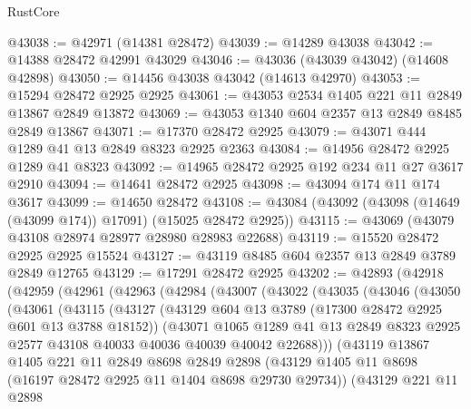 \begin{lexlean}{RustCore}
\begin{coremodule}
@43038 := @42971 (@14381 @28472)
@43039 := @14289 @43038
@43042 := @14388 @28472 @42991 @43029
@43046 := @43036 (@43039 @43042) (@14608 @42898)
@43050 := @14456 @43038 @43042 (@14613 @42970)
@43053 := @15294 @28472 @2925 @2925
@43061 := @43053 @2534 @1405 @221 @11 @2849 @13867 @2849 @13872
@43069 := @43053 @1340 @604 @2357 @13 @2849 @8485 @2849 @13867
@43071 := @17370 @28472 @2925
@43079 := @43071 @444 @1289 @41 @13 @2849 @8323 @2925 @2363
@43084 := @14956 @28472 @2925 @1289 @41 @8323
@43092 := @14965 @28472 @2925 @192 @234 @11 @27 @3617 @2910
@43094 := @14641 @28472 @2925
@43098 := @43094 @174 @11 @174 @3617
@43099 := @14650 @28472
@43108 := @43084 (@43092 (@43098 (@14649 (@43099 @174)) @17091) (@15025 @28472 @2925))
@43115 := @43069 (@43079 @43108 @28974 @28977 @28980 @28983 @22688)
@43119 := @15520 @28472 @2925 @2925 @15524
@43127 := @43119 @8485 @604 @2357 @13 @2849 @3789 @2849 @12765
@43129 := @17291 @28472 @2925
@43202 := @42893
    (@42918
      (@42959
        (@42961
          (@42963
            (@42984
              (@43007
                (@43022
                  (@43035
                    (@43046
                      (@43050
                        (@43061
                          (@43115
                            (@43127
                              (@43129 @604 @13 @3789 (@17300 @28472 @2925 @601 @13 @3788 @18152))
                              (@43071
                                @1065
                                @1289
                                @41
                                @13
                                @2849
                                @8323
                                @2925
                                @2577
                                @43108
                                @40033
                                @40036
                                @40039
                                @40042
                                @22688)))
                          (@43119
                            @13867
                            @1405
                            @221
                            @11
                            @2849
                            @8698
                            @2849
                            @2898
                            (@43129
                              @1405
                              @11
                              @8698
                              (@16197 @28472 @2925 @11 @1404 @8698 @29730 @29734))
                            (@43129
                              @221
                              @11
                              @2898

\end{coremodule}
\end{lexlean}
